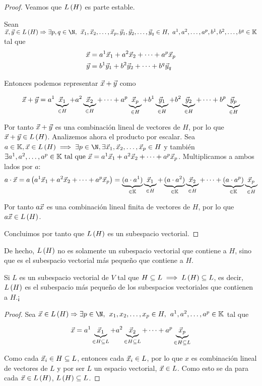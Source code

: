 \documentclass[../algebra_lineal.tex]{subfiles}
\begin{document}
\begin{proof}
    Veamos que $L\left(H\right)$ es parte estable.

    Sean $\vx, \vy \in \lspan{H} \Rightarrow \exists p, q \in \N, \spc \dlst{\vx}{p}, \dlst{\vy}{q} \in H, \, \, \ulst{a}{p}, \ulst{b}{q} \in \K $
    tal que 
    \begin{align*}
        \vec{x} &= {a}^{1}\vec{x}_{1}+{a}^{2}\vec{x}_{2}+\dots+{a}^{p}\vec{x}_{p} \\
        \vec{y} &= {b}^{1}\vec{y}_{1}+{b}^{2}\vec{y}_{2}+\dots+{b}^{q}\vec{y}_{q}
    \end{align*}

    Entonces podemos representar $\vec{x} + \vec{y}$ como
    
    \[
        \vec{x} + \vec{y} = a^1\underbrace{\vec{x}_1}_{\in H}+a^2\underbrace{\vec{x}_2}_{\in H}+\dots+a^p\underbrace{\vec{x}_p}_{\in H} + b^1\underbrace{\vec{y}_1}_{\in H}+b^2\underbrace{\vec{y}_2}_{\in H}+\dots+b^p\underbrace{\vec{y}_p}_{\in H}
    \]

    Por tanto $\vec{x} + \vec{y}$ es una combinación lineal de vectores de $H$, por lo que $\vec{x} + \vec{y} \in L\left(H\right)$. Analizemos ahora el producto por escalar. Sea $a \in \K, \vx \in \lspan{H} \implies \exists p \in \N, \space \exists \dlst{\vx}{p} \in H$ y también $\exists {a}^{1}, {a}^{2}, \dots, {a}^{p} \in \mathbb{K} \mathrm{\,\, tal \,\, que \,\,} \vec{x} = {a}^{1}\vec{x}_{1}+{a}^{2}\vec{x}_{2}+\dots+{a}^{p}\vec{x}_{p}$.  Multiplicamos a ambos lados por $a$:
    \[a\cdot \vec{x} = a \left( {a}^{1}\vec{x}_{1}+{a}^{2}\vec{x}_{2}+\dots+{a}^{p}\vec{x}_{p} \right) = \underbrace{(a \cdot a^1)}_{\in \mathbb{K}}\underbrace{\vec{x}_1}_{\in H} + \underbrace{(a \cdot a^2)}_{\in \mathbb{K}}\underbrace{\vec{x}_2}_{\in H} + \dots + \underbrace{(a \cdot a^p)}_{\in \mathbb{K}}\underbrace{\vec{x}_p}_{\in H}\]

    Por tanto $a\vec{x}$ es una combinación lineal finita de vectores de $H$, por lo que $a\vec{x} \in L\left(H\right)$.

    Concluimos por tanto que $L\left(H\right)$ es un subespacio vectorial.
\end{proof}

De hecho, $L\left(H\right)$ no es solamente un subespacio vectorial que contiene a $H$, sino que es el subespacio vectorial más pequeño que contiene a $H$. 

\begin{proposition}
    Si $L$ es un subespacio vectorial de $V$ tal que $H \subseteq L \implies L\left(H\right) \subseteq L$, es decir, $L\left(H\right)$ es el subespacio más pequeño de los subespacios vectoriales que contienen a $H$.¡
\end{proposition}

\begin{proof}
Sea $\vx \in \lspan{H} \Rightarrow \exists p \in \N, \spc \dlst{x}{p} \in H, \spc \ulst{a}{p} \in \K$ tal que 

\[ \vec{x} = a^1 \underbrace{\vec{x}_1}_{\in H \subseteq L} +  a^2\underbrace{\vec{x}_2}_{\in H \subseteq L} + \dots +  a^p \underbrace{\vec{x}_p}_{\in H \subseteq L} \]

Como cada $\vec{x}_i \in H \subseteq L$, entonces cada $\vec{x}_i \in L$, por lo que $x$ es combinación lineal de vectores de $L$ y por ser $L$ un espacio vectorial, $\vec{x} \in L$. Como esto se da para cada $\vec{x} \in L\left(H\right)$, $L\left(H\right) \subseteq L$.
\end{proof}
\end{document}
